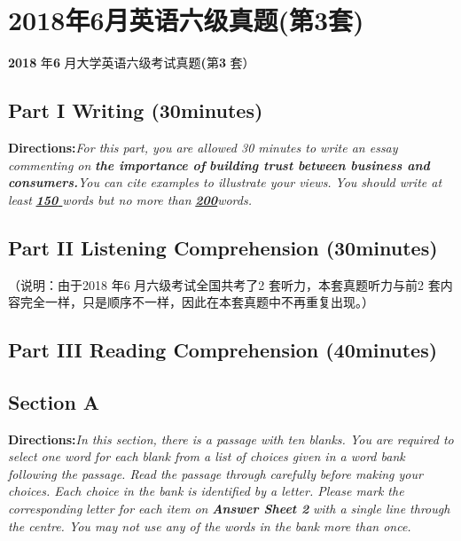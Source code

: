 \documentclass[UTF8,11pt]{ctexart}
\begin{document}
\section*{2018年6月英语六级真题(第3套)}
\textbf{2018} 年\textbf{6} 月大学英语六级考试真题\textbf{(}第\textbf{3} 套）


\subsection*{\textbf{Part I} \textbf{Writing} \textbf{(30minutes)}}


\textbf{Directions:}\textit{For this part, you are allowed 30 minutes to write an essay commenting on}\textbf{\textit{ the importance of}} \textbf{\textit{building trust between business and consumers.}}\textit{You can cite examples to illustrate your views.} \textit{You should write at least}\textbf{\textit{ }}\textbf{\textit{\uline{150}}}\textit{\uline{ }}\textit{words but no more than}\textbf{\textit{ }}\textbf{\textit{\uline{200}}}\textit{words.}


\subsection*{\textbf{Part II} \textbf{Listening} \textbf{Comprehension} \textbf{(30minutes)}}


（说明：由于2018 年6 月六级考试全国共考了2 套听力，本套真题听力与前2 套内容完全一样，只是顺序不一样，因此在本套真题中不再重复出现。）


\subsection*{\textbf{Part III} \textbf{Reading} \textbf{Comprehension} \textbf{(40minutes)}}


\subsection*{\textbf{Section A}}


\textbf{Directions:}\textit{In this section, there is a passage with ten blanks. You are required to select one word for each} \textit{blank from a list of choices given in a word bank following the passage. Read the passage through carefully} \textit{before making your choices. Each choice in the bank is identified by a letter. Please mark the corresponding} \textit{letter for each item on}\textbf{\textit{ Answer Sheet 2}}\textit{ with a single line through the centre. You may not use any of the} \textit{words in the bank more than once.}
\end{document}
